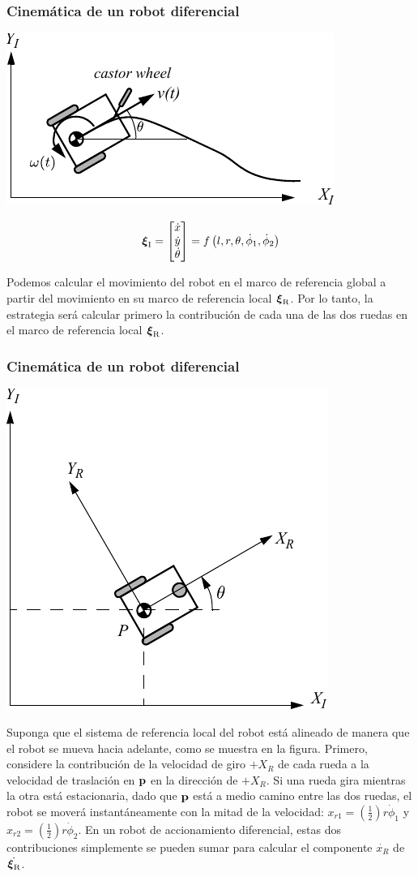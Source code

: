 \begin{frame}
    \frametitle{Cinemática de un robot diferencial}

    \begin{center}
        \includegraphics[width=0.4\columnwidth]{./images/differential_drive.pdf}
    \end{center}


    \begin{equation*}
        \prescript{\mathrm{}}{}{{\boldsymbol{\mathbf{\xi}}}_\mathrm{I}} =
        \begin{bmatrix}
            \dot{x}\\
            \dot{y}\\
            \dot{\theta}
        \end{bmatrix} =
        f\left( l,r,\theta,\dot{\phi}_{1},\dot{\phi}_{2}\right)
    \end{equation*}

    Podemos calcular el movimiento del robot en el marco de referencia global a partir del movimiento en su marco de referencia local $\prescript{\mathrm{}}{}{{\boldsymbol{\mathbf{\xi}}}_\mathrm{R}}$. Por lo tanto, la estrategia será calcular primero la contribución de cada una de las dos ruedas en el marco de referencia local $\prescript{\mathrm{}}{}{{\boldsymbol{\mathbf{\xi}}}_\mathrm{R}}$.
\end{frame}

\begin{frame}
    \frametitle{Cinemática de un robot diferencial}
    \small
    \begin{center}
        \includegraphics[width=0.4\columnwidth]{./images/coordinate_systems.pdf}
    \end{center}
    Suponga que el sistema de referencia local del robot está alineado de manera que el robot se mueva hacia adelante, como se muestra en la figura. Primero, considere la contribución de la velocidad de giro $+X_R$ de cada rueda a la velocidad de traslación en $\boldsymbol{\mathbf{p}}$ en la dirección de $+X_R$. Si una rueda gira mientras la otra está estacionaria, dado que $\boldsymbol{\mathbf{p}}$ está a medio camino entre las dos ruedas, el robot se moverá instantáneamente con la mitad de la velocidad: $x_{r1} = \left(\frac{1}{2}\right)r\dot{\phi}_{1}$ y $ x_{r2} = \left(\frac{1}{2}\right)r\dot{\phi}_{2}$. En un robot de accionamiento diferencial, estas dos contribuciones simplemente se pueden sumar para calcular el componente $\dot{x_R}$ de $\dot{\prescript{\mathrm{}}{}{{\boldsymbol{\mathbf{\xi}}}_\mathrm{R}}}$.
\end{frame}

